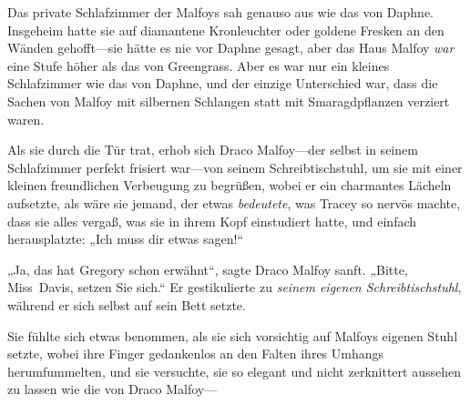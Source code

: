 Das private Schlafzimmer der Malfoys sah genauso aus wie das von Daphne. Insgeheim hatte sie auf diamantene Kronleuchter oder goldene Fresken an den Wänden gehofft—sie hätte es nie vor Daphne gesagt, aber das Haus Malfoy \emph{war} eine Stufe höher als das von Greengrass. Aber es war nur ein kleines Schlafzimmer wie das von Daphne, und der einzige Unterschied war, dass die Sachen von Malfoy mit silbernen Schlangen statt mit Smaragdpflanzen verziert waren.

Als sie durch die Tür trat, erhob sich Draco Malfoy—der selbst in seinem Schlafzimmer perfekt frisiert war—von seinem Schreibtischstuhl, um sie mit einer kleinen freundlichen Verbeugung zu begrüßen, wobei er ein charmantes Lächeln aufsetzte, als wäre sie jemand, der etwas \emph{bedeutete}, was Tracey so nervös machte, dass sie alles vergaß, was sie in ihrem Kopf einstudiert hatte, und einfach herausplatzte: „Ich muss dir etwas sagen!“

„Ja, das hat Gregory schon erwähnt“, sagte Draco Malfoy sanft. „Bitte, Miss~Davis, setzen Sie sich.“ Er gestikulierte zu \emph{seinem eigenen Schreibtischstuhl}, während er sich selbst auf sein Bett setzte.

Sie fühlte sich etwas benommen, als sie sich vorsichtig auf Malfoys eigenen Stuhl setzte, wobei ihre Finger gedankenlos an den Falten ihres Umhangs herumfummelten, und sie versuchte, sie so elegant und nicht zerknittert aussehen zu lassen wie die von Draco Malfoy—

